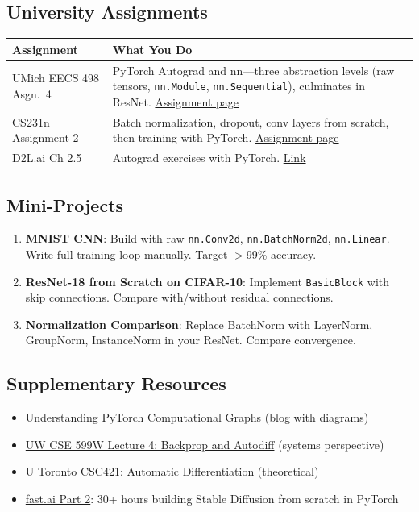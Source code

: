 \documentclass[11pt,letterpaper]{article}
\begin{document}
\subsection{University Assignments}

\begin{longtable}{@{}p{2.2in}p{3.6in}@{}}
\toprule
\textbf{Assignment} & \textbf{What You Do} \\
\midrule
\endhead
UMich EECS 498 Asgn.\ 4 & PyTorch Autograd and nn---three abstraction levels (raw tensors, \texttt{nn.Module}, \texttt{nn.Sequential}), culminates in ResNet. \href{https://web.eecs.umich.edu/~justincj/teaching/eecs498/FA2020/assignment4.html}{Assignment page} \\
\addlinespace
CS231n Assignment 2 & Batch normalization, dropout, conv layers from scratch, then training with PyTorch. \href{https://cs231n.github.io/assignments2025/assignment2/}{Assignment page} \\
\addlinespace
D2L.ai Ch 2.5 & Autograd exercises with PyTorch. \href{https://d2l.ai/chapter_preliminaries/autograd.html}{Link} \\
\bottomrule
\end{longtable}

\subsection{Mini-Projects}

\begin{enumerate}[nosep]
    \item \textbf{MNIST CNN}: Build with raw \texttt{nn.Conv2d}, \texttt{nn.BatchNorm2d}, \texttt{nn.Linear}. Write full training loop manually. Target $>$99\% accuracy.
    \item \textbf{ResNet-18 from Scratch on CIFAR-10}: Implement \texttt{BasicBlock} with skip connections. Compare with/without residual connections.
    \item \textbf{Normalization Comparison}: Replace BatchNorm with LayerNorm, GroupNorm, InstanceNorm in your ResNet. Compare convergence.
\end{enumerate}

\subsection{Supplementary Resources}

\begin{itemize}[nosep]
    \item \href{https://www.eletreby.me/blog/understanding-pytorch-computational-graphs}{Understanding PyTorch Computational Graphs} (blog with diagrams)
    \item \href{https://dlsys.cs.washington.edu/pdf/lecture4.pdf}{UW CSE 599W Lecture 4: Backprop and Autodiff} (systems perspective)
    \item \href{https://www.cs.toronto.edu/~rgrosse/courses/csc421_2019/readings/L06\%20Automatic\%20Differentiation.pdf}{U Toronto CSC421: Automatic Differentiation} (theoretical)
    \item \href{https://course.fast.ai/Lessons/part2.html}{fast.ai Part 2}: 30+ hours building Stable Diffusion from scratch in PyTorch
\end{itemize}
\end{document}
